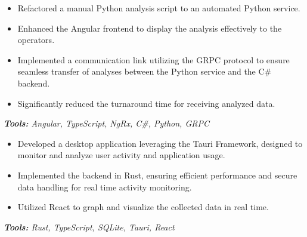 \documentclass[10pt,letter]{altacv}
\begin{document}
\divider

\begin{itemize}
  \item Refactored a manual Python analysis script to an automated Python service.
  \item Enhanced the Angular frontend to display the analysis effectively to the operators.
  \item Implemented a communication link utilizing the GRPC protocol to ensure seamless transfer of analyses between the Python service and the C\# backend.
  \item Significantly reduced the turnaround time for receiving analyzed data.
\end{itemize}
\textit{\textbf{Tools:} Angular, TypeScript, NgRx,  C\#, Python, GRPC}

\medskip



\begin{itemize}
  \item Developed a desktop application leveraging the Tauri Framework, designed to monitor and analyze user activity and application usage.
  \item Implemented the backend in Rust, ensuring efficient performance and secure data handling for real time activity monitoring.
  \item Utilized React to graph and visualize the collected data in real time.
\end{itemize}
\textit{\textbf{Tools:} Rust, TypeScript, SQLite, Tauri, React}

\divider
\end{document}
